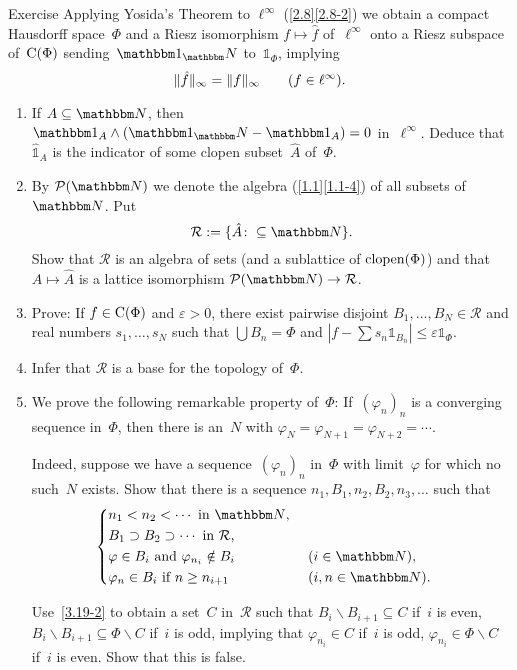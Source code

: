 \documentclass[main.tex]{subfiles}
\begin{document}
\begin{psec}{3.19}{Exercise}
Applying Yosida's Theorem to $\ell^\infty$ (\ref{2.8}\ref{2.8-2})
we obtain a compact Hausdorff space~$\Phi$
and a Riesz isomorphism $f\mapsto \hat{f}$
of~$\ell^\infty$ onto a Riesz subspace of~$\mathrm{C}(\Phi)$
sending~$\mathbb{1}_\N$ to~$\mathbb{1}_\Phi$,
implying
\begin{equation*}
\|\hat{f}\|_\infty = \|f\|_\infty \qquad (f\in \ell^\infty)\text{.}
\end{equation*}
\begin{enumerate}
\item \label{3.19-1}
If $A\subseteq \N$,
then $\mathbb{1}_A \wedge (\mathbb{1}_\N - \mathbb{1}_A)=0$
in~$\ell^\infty$.
Deduce that~$\hat{\mathbb{1}}_A$ is the indicator
of some clopen subset~$\hat{A}$ of~$\Phi$.
%
\item \label{3.19-2}
By $\mathcal{P}(\N)$ we denote the algebra (\ref{1.1}\ref{1.1-4})
of all subsets of~$\N$.
Put
\begin{equation*}
\mathcal{R}:=\{ \hat{A}\colon \subseteq \N \}\htam{.}
\end{equation*}
Show that $\mathcal{R}$ is an algebra of sets
(and a sublattice of $\mathrm{clopen}(\Phi)$)
and that $A\mapsto \hat{A}$
is a lattice isomorphism $\mathcal{P}(\N)\ra \mathcal{R}$.
%
\item \label{3.19-3}
Prove: If $f\in\mathrm{C}(\Phi)$ and $\varepsilon>0$,
there exist pairwise disjoint $B_1,\dotsc,B_N\in\mathcal{R}$
and real numbers $s_1,\dotsc,s_N$
such that $\bigcup B_n = \Phi$
and $| f- \sum s_n \mathbb{1}_{B_n}| \leq \varepsilon \mathbb{1}_\Phi$.
%
\item \label{3.19-4}
Infer that $\mathcal{R}$ is a base for the topology of~$\Phi$.
%
\item \label{3.19-5}
We prove the following remarkable property of~$\Phi$:
If~$(\varphi_n)_n$ is a converging sequence in~$\Phi$,
then there is an~$N$ with $\varphi_N=\varphi_{N+1}=\varphi_{N+2}=\dotsb$.

Indeed,
suppose we have a sequence~$(\varphi_n)_n$ in~$\Phi$
with limit~$\varphi$
for which no such~$N$ exists.
Show that there is a sequence 
$n_1,B_1,n_2,B_2,n_3,\dotsc$ 
such that
\begin{equation*}
\left\{
\begin{aligned}
&n_1 < n_2 < \dotsb\htam{ in }\N\htam{, } \\
&B_1\supset B_2 \supset \dotsb\htam{ in }\mathcal{R}\htam{,} \\
&\varphi\in B_i\htam{ and } \varphi_{n_i} \notin B_i \quad 
    &&(i\in \N)\htam{,} \\
&\varphi_n\in B_i\htam{ if }n\geq n_{i+1} 
    && (i,n\in \N)\htam{.}
\end{aligned}
\right. 
\end{equation*}

Use~\ref{3.19-2} to obtain a set~$C$ in~$\mathcal{R}$
such that $B_i \backslash B_{i+1}\subseteq C$
if~$i$ is even,
$B_i \backslash B_{i+1} \subseteq \Phi\backslash C$
if~$i$ is odd, 
implying that $\varphi_{n_i}\in C$
if~$i$ is odd,
$\varphi_{n_i}\in\Phi\backslash C$
if~$i$ is even.
Show that this is false.
\end{enumerate}
\end{psec}
\end{document}
